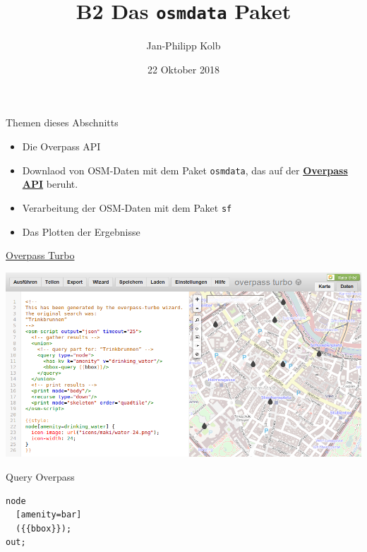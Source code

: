 \documentclass[ignorenonframetext,]{beamer}
\title{B2 Das \texttt{osmdata} Paket}
\author{Jan-Philipp Kolb}
\date{22 Oktober 2018}
\providecommand{\tightlist}{%
  \setlength{\itemsep}{0pt}\setlength{\parskip}{0pt}}
\begin{document}
\frame{\titlepage}

\begin{frame}[fragile]{Themen dieses Abschnitts}

\begin{itemize}
\tightlist
\item
  Die Overpass API
\end{itemize}

\begin{itemize}
\item
  Downlaod von OSM-Daten mit dem Paket \texttt{osmdata}, das auf der
  \href{https://wiki.openstreetmap.org/wiki/Overpass_API}{\textbf{Overpass
  API}} beruht.
\item
  Verarbeitung der OSM-Daten mit dem Paket \texttt{sf}
\item
  Das Plotten der Ergebnisse
\end{itemize}

\end{frame}

\begin{frame}{\href{https://overpass-turbo.eu/}{Overpass Turbo}}

\includegraphics{figure/Overpass_turbo_query_wizard_result_DE.png}

\end{frame}

\begin{frame}[fragile]{Query Overpass}

\begin{verbatim}
node
  [amenity=bar]
  ({{bbox}});
out;
\end{verbatim}

\end{frame}
\end{document}
